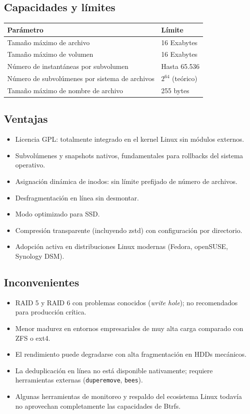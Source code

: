 \documentclass[12pt,letterpaper]{article}
\begin{document}
\subsection{Capacidades y límites}
\begin{center}
  \begin{tabular}{ll}
    \hline
    \textbf{Parámetro} & \textbf{Límite} \\
    \hline
    Tamaño máximo de archivo & 16 Exabytes \\
    Tamaño máximo de volumen & 16 Exabytes \\
    Número de instantáneas por subvolumen & Hasta 65.536 \\
    Número de subvolúmenes por sistema de archivos & $2^{64}$ (teórico) \\
    Tamaño máximo de nombre de archivo & 255 bytes \\
    \bottomrule
  \end{tabular}
\end{center}

\subsection{Ventajas}
\begin{itemize}
\item Licencia GPL: totalmente integrado en el kernel Linux sin módulos externos.
\item Subvolúmenes y snapshots nativos, fundamentales para rollbacks del sistema operativo.
\item Asignación dinámica de inodos: sin límite prefijado de número de archivos.
\item Desfragmentación en línea sin desmontar.
\item Modo optimizado para SSD.
\item Compresión transparente (incluyendo zstd) con configuración por directorio.
\item Adopción activa en distribuciones Linux modernas (Fedora, openSUSE, Synology DSM).
\end{itemize}

\subsection{Inconvenientes}
\begin{itemize}
\item RAID 5 y RAID 6 con problemas conocidos (\emph{write hole}); no recomendados para producción crítica.
\item Menor madurez en entornos empresariales de muy alta carga comparado con ZFS o ext4.
\item El rendimiento puede degradarse con alta fragmentación en HDDs mecánicos.
\item La deduplicación en línea no está disponible nativamente; requiere herramientas externas (\texttt{duperemove}, \texttt{bees}).
\item Algunas herramientas de monitoreo y respaldo del ecosistema Linux todavía no aprovechan completamente las capacidades de Btrfs.
\end{itemize}
\end{document}
